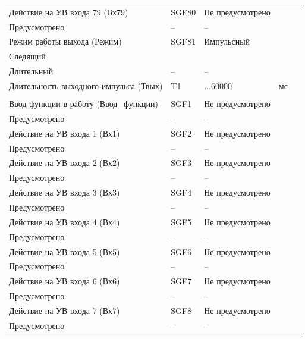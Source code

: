 \begin{longtable}{|>{\centering\arraybackslash}m{5.3cm}|>{\centering\arraybackslash}m{3.3cm}|>{\centering\arraybackslash}m{4.2cm}|>{\centering\arraybackslash}m{1.8cm}|>{\centering\arraybackslash}m{1cm}|}
\hline
\centering Действие на УВ входа 79 (Вх79)  & \centering SGF80 & \centering Не предусмотрено \\ Предусмотрено & \centering -- & \centering \arraybackslash -- \\
\hline
\centering Режим работы выхода (Режим)  & \centering SGF81 & \centering Импульсный \\ Следящий \\ Длительный & \centering -- & \centering \arraybackslash -- \\
\hline
\centering Длительность выходного импульса (Твых)  & \centering T1 & \centering 50...60000 & \centering мс & \centering \arraybackslash 10 \\
\hline
\multicolumn{5}{|c|}{ УВ5 } \\ \hline 
\centering Ввод функции в работу (Ввод\_функции)  & \centering SGF1 & \centering Не предусмотрено \\ Предусмотрено & \centering -- & \centering \arraybackslash -- \\
\hline
\centering Действие на УВ входа 1 (Вх1)  & \centering SGF2 & \centering Не предусмотрено \\ Предусмотрено & \centering -- & \centering \arraybackslash -- \\
\hline
\centering Действие на УВ входа 2 (Вх2)  & \centering SGF3 & \centering Не предусмотрено \\ Предусмотрено & \centering -- & \centering \arraybackslash -- \\
\hline
\centering Действие на УВ входа 3 (Вх3)  & \centering SGF4 & \centering Не предусмотрено \\ Предусмотрено & \centering -- & \centering \arraybackslash -- \\
\hline
\centering Действие на УВ входа 4 (Вх4)  & \centering SGF5 & \centering Не предусмотрено \\ Предусмотрено & \centering -- & \centering \arraybackslash -- \\
\hline
\centering Действие на УВ входа 5 (Вх5)  & \centering SGF6 & \centering Не предусмотрено \\ Предусмотрено & \centering -- & \centering \arraybackslash -- \\
\hline
\centering Действие на УВ входа 6 (Вх6)  & \centering SGF7 & \centering Не предусмотрено \\ Предусмотрено & \centering -- & \centering \arraybackslash -- \\
\hline
\centering Действие на УВ входа 7 (Вх7)  & \centering SGF8 & \centering Не предусмотрено \\ Предусмотрено & \centering -- & \centering \arraybackslash -- \\

\end{longtable}
